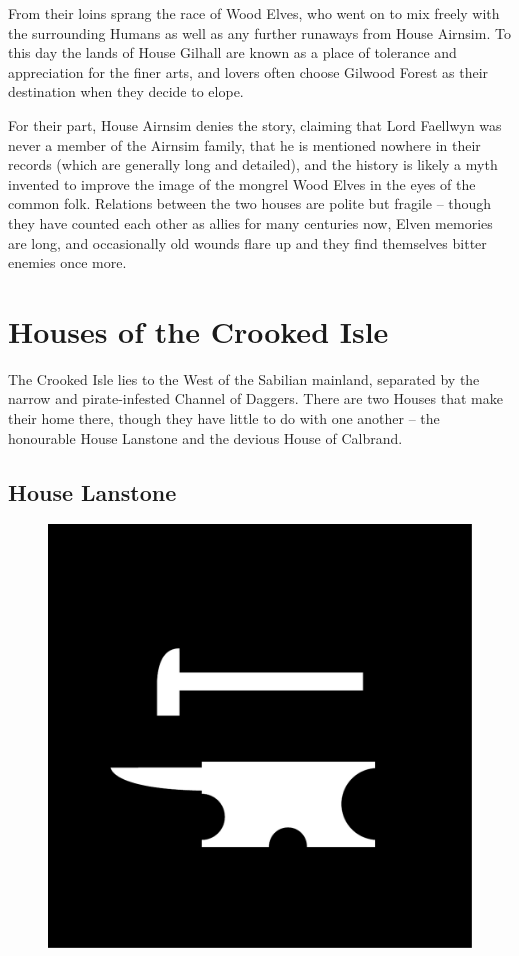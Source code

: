 \documentclass[10pt,twoside,openright,a4paper,twocolumn]{book}
\begin{document}
From their loins sprang the race of Wood Elves, who went on to mix freely with
the surrounding Humans as well as any further runaways from House Airnsim.  To
this day the lands of House Gilhall are known as a place of tolerance and
appreciation for the finer arts, and lovers often choose Gilwood Forest as
their destination when they decide to elope.

For their part, House Airnsim denies the story, claiming that Lord Faellwyn was
never a member of the Airnsim family, that he is mentioned nowhere in their
records (which are generally long and detailed), and the history is likely a
myth invented to improve the image of the mongrel Wood Elves in the eyes of the
common folk.  Relations between the two houses are polite but fragile -- though
they have counted each other as allies for many centuries now, Elven memories
are long, and occasionally old wounds flare up and they find themselves bitter
enemies once more.

\section{Houses of the Crooked Isle}

The Crooked Isle lies to the West of the Sabilian mainland, separated by the
narrow and pirate-infested Channel of Daggers.  There are two Houses that make
their home there, though they have little to do with one another -- the
honourable House Lanstone and the devious House of Calbrand.

\subsection*{House Lanstone}

\begin{figure}
  \includegraphics[width=0.48\columnwidth]{images/HouseLanstone}
\end{figure}
\end{document}
